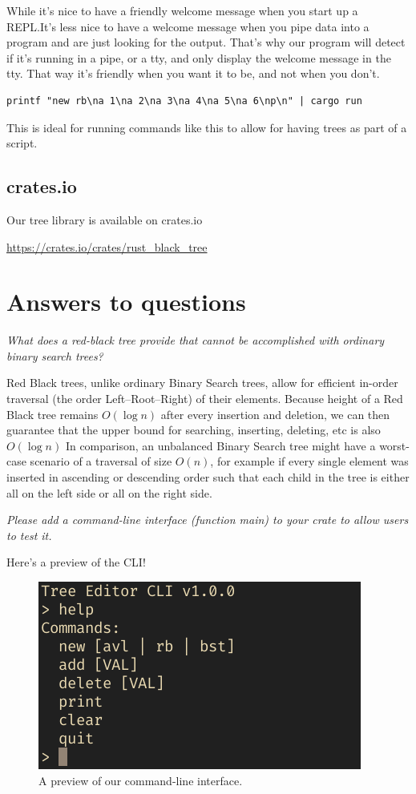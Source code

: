 \documentclass[letterpaper]{article}
\begin{document}
While it's nice to have a friendly welcome message when you start up a
REPL.\@ It's less nice to have a welcome message when you pipe data into
a program and are just looking for the output. That's why our program
will detect if it's running in a pipe, or a tty, and only display the
welcome message in the tty. That way it's friendly when you want it to
be, and not when you don't.

\begin{verbatim}
printf "new rb\na 1\na 2\na 3\na 4\na 5\na 6\np\n" | cargo run
\end{verbatim}

This is ideal for running commands like this to allow for having trees
as part of a script.

\subsection{crates.io}
Our tree library is available on crates.io 

\url{https://crates.io/crates/rust_black_tree}

\section{Answers to questions}

\textit{What does a red-black tree provide that cannot be accomplished with
ordinary binary search trees?}

Red Black trees, unlike ordinary Binary Search trees, allow for efficient
in-order traversal (the order Left–Root–Right) of their elements.
Because  height of a Red Black tree remains \(O(\log n)\) after every
insertion and deletion, we can then guarantee that the
upper bound for searching, inserting, deleting, etc is also \(O(\log n)\)
In comparison, an unbalanced Binary Search tree might have a worst-case scenario
of a traversal of size \(O(n)\), for example if every single element was
inserted in ascending or descending order such that each child in the tree is
either all on the left side or all on the right side.

\textit{Please add a command-line interface (function main) to your crate to
allow users to test it.}

Here's a preview of the CLI!
\begin{figure}[H]
      \centering
      \includegraphics[width=.8\textwidth]{cli.png}
      \caption{A preview of our command-line interface.}
\end{figure}
\end{document}
